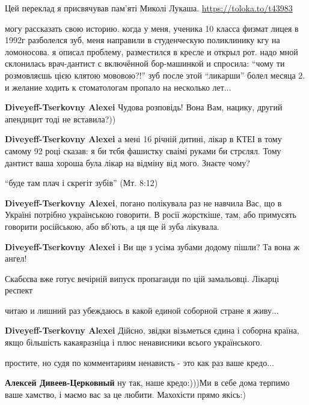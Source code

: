 \begin{itemize}

Цей переклад я присвячував пам'яті Миколі Лукаша.
\url{https://toloka.to/t43983}


могу рассказать свою историю. когда у меня, ученика 10 класса физмат лицея в
1992г разболелся зуб, меня направили в студенческую поликлинику кгу на
ломоносова. я описал проблему, разместился в кресле и открыл рот. надо мной
склонилась врач-дантист с включённой бор-машинкой и спросила: \enquote{чому ти
розмовляєшь цією клятою мововою?!} зуб после этой \enquote{ликарши} болел
месяца 2. и желание ходить к стоматологам пропало на несколько лет...

\textbf{Diveyeff-Tserkovny Alexei} Чудова розповідь!  Вона Вам, нацику, другий апендицит
тоді не вставила?))

\textbf{Diveyeff-Tserkovny Alexei} а мені 16 річній дитині, лікар в КТЕІ в тому самому
92 році сказав: я би тєбя фашистку сваімі руками би стрєлял.  Тому дантист ваша
хороша була лікар на відміну від мого. Знаєте чому?

\enquote{буде там плач і скрегіт зубів} (Мт. 8:12)

\textbf{Diveyeff-Tserkovny Alexei}, погано полікувала раз не навчила Вас, що в
Україні потрібно українською говорити.  В росії жорсткіше, там, або примусять
говорити російською, або вб'ють, а ця ще й зуба лікувала.

\textbf{Diveyeff-Tserkovny Alexei} і Ви ще з усіма зубами додому пішли? Та вона ж ангел!

Скабєєва вже готує вечірній випуск пропаганди по цій замальовці. Лікарці респект


читаю и лишний раз убеждаюсь в какой единой соборной стране я живу...


\textbf{Diveyeff-Tserkovny Alexei} Дійсно, звідки візьметься єдина і соборна
країна, якщо більшість какаяразніца і плюс ненависники всього українського.


простите, но судя по комментариям ненависть - это как раз ваше кредо...


\textbf{Алексей Дивеев-Церковный} ну так, наше кредо:)))Ми в себе дома терпимо
ваше хамство, і маємо вас за це любити. Махохісти прямо якісь:)


\end{itemize}
